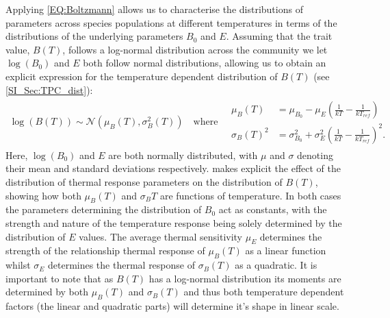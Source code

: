 \documentclass{article}
\begin{document}
Applying \cref{EQ:Boltzmann} allows us to characterise the distributions of parameters across species populations at different temperatures in terms of the distributions of the underlying parameters $B_0$ and $E$. Assuming that the trait value, $B(T)$, follows a log-normal distribution across the community we let $\log(B_0)$ and $E$ both follow normal distributions, allowing us to obtain an explicit expression for the temperature dependent distribution of $B(T)$ (see \cref{SI_Sec:TPC_dist}):
\begin{align} \label{EQ:Boltz_dist}
    \log(B(T)) \sim \mathcal{N}\left(\mu_{B}(T) , \sigma_{B}^2(T) \right) 
    \quad \text{where} \quad
    \begin{array}{cc}
        \mu_B(T) &= \mu_{B_0} - \mu_{E} \left(\frac{1}{kT} - \frac{1}{k T_{ref} }\right)  \\
        \sigma_{B}(T)^2 &= \sigma_{B_0}^2 + \sigma_{E}^2 \left(\frac{1}{kT} - \frac{1}{k T_{ref} }\right)^2 .
    \end{array}
\end{align}
Here, $\log(B_0)$ and $E$ are both normally distributed, with $\mu$ and $\sigma$ denoting their mean and standard deviations respectively.  makes explicit the effect of the distribution of thermal response parameters on the distribution of $B(T)$, showing how both $\mu_{B}(T)$ and $\sigma_{B}T$ are functions of temperature. In both cases the parameters determining the distribution of $B_0$ act as constants, with the strength and nature of the temperature response being solely determined by the distribution of $E$ values. The average thermal sensitivity $\mu_E$ determines the strength of the relationship thermal response of $\mu_B(T)$ as a linear function whilst $\sigma_E$ determines the thermal response of $\sigma_{B}(T)$ as a quadratic. It is important to note that as $B(T)$ has a log-normal distribution its moments are determined by both $\mu_B(T)$ and $\sigma_B(T)$ and thus both temperature dependent factors (the linear and quadratic parts) will determine it's shape in linear scale.
\end{document}
